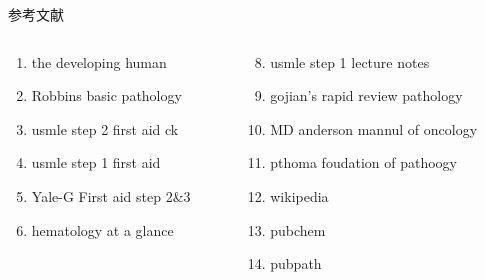 \documentclass[
  ignorenonframetext,
]{beamer}
\begin{document}
\begin{frame}
\begin{block}{参考文献}
\protect\hypertarget{ux53c2ux8003ux6587ux732e}{}
\begin{columns}[T]
\begin{column}{0.5\textwidth}
\begin{enumerate}
\item
  the developing human
\item
  Robbins basic pathology
\item
  usmle step 2 first aid ck
\item
  usmle step 1 first aid
\item
  Yale-G First aid step 2\&3
\item
  hematology at a glance
\end{enumerate}
\end{column}

\begin{column}{0.5\textwidth}
\begin{enumerate}
\setcounter{enumi}{7}
\item
  usmle step 1 lecture notes
\item
  gojian's rapid review pathology
\item
  MD anderson mannul of oncology
\item
  pthoma foudation of pathoogy
\item
  wikipedia
\item
  pubchem
\item
  pubpath
\end{enumerate}
\end{column}
\end{columns}
\end{block}
\end{frame}

\begin{frame}
\end{frame}
\end{document}
